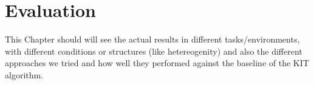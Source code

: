 
\chapter{Evaluation}

This Chapter should will see the actual results in different tasks/environments, with different conditions or structures (like hetereogenity) and also the different approaches we tried and how well they performed against the baseline of the KIT algorithm.